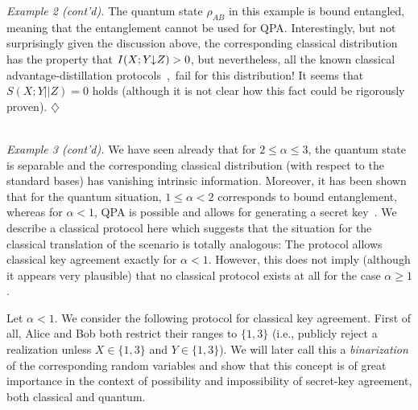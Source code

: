\documentclass{article}
\newcommand{\exend}{\hspace*{\fill} $\diamondsuit$}
\newcommand{\noi}{\noindent}
\newcommand{\al}{\alpha}
\newcommand{\ida}{I(X;Y\hspace{-1.3mm}\downarrow\hspace{-0.8mm} Z)}
\begin{document}
\noi
{\it Example 2 (cont'd).}
 The quantum state $\rho_{AB}$ in this example  is bound
entangled, meaning that the entanglement cannot be used for QPA. Interestingly,
but not surprisingly given the discussion above, the corresponding classical 
distribution has the property that $\ida>0$, but nevertheless, all the known 
classical advantage-distillation protocols~\cite{ka},\,  \cite{ittrans}
 fail for this distribution! It seems
that $S(X;Y||Z)=0$ holds (although it is not clear  how this fact could 
be rigorously proven).
\exend
\\ \

\noi
{\it Example 3 (cont'd).}
 We have seen already
that for $2\leq \al\leq 3$, the quantum state is separable and the 
corresponding classical distribution (with respect to the standard bases)
has vanishing intrinsic information. Moreover, it has been shown that for the
quantum situation, $1\leq \al<2$ corresponds to bound entanglement, 
whereas for $\al<1$, QPA is possible and allows
for generating  a secret key~\cite{dreih}. We describe a classical 
protocol here which suggests
that the situation for the classical translation of the scenario
is totally analogous: The  
protocol allows classical key agreement exactly for $\al<1$. 
However, this does not imply (although it appears very plausible) that 
no classical protocol exists at all for the case $\al\geq 1$.

Let $\al<1$. We consider the following protocol for classical key agreement.
First of all, Alice and Bob both restrict their ranges to $\{1,3\}$ (i.e.,
publicly reject a realization unless $X\in\{1,3\}$ and  $Y\in\{1,3\}$). 
We will later call this a {\em binarization\/} of the corresponding 
random variables and show that this concept  is of great importance 
in the context of possibility and impossibility of secret-key 
agreement, both classical and quantum.
\end{document}

